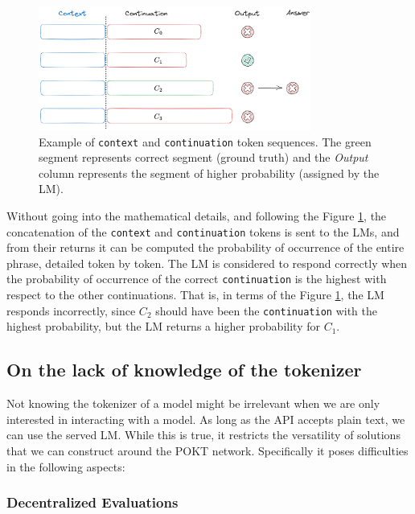 \begin{figure}[h]
    \centering
    \includegraphics[width=0.8\textwidth]{img/loglikelihood_example.png}
    \caption{Example of \texttt{context} and \texttt{continuation} token sequences. The green segment represents correct segment (ground truth) and the \emph{Output} column represents the segment of higher probability (assigned by the \gls{LM}).}
    \label{fig:loglikelihood_example}
\end{figure}

Without going into the mathematical details, and following the Figure \ref{fig:loglikelihood_example}, the concatenation of the \texttt{context} and \texttt{continuation} tokens is sent to the \glspl{LM}, and from their returns it can be computed the probability of occurrence of the entire phrase, detailed token by token. 
The \gls{LM} is considered to respond correctly when the probability of occurrence of the correct \texttt{continuation} is the highest with respect to the other continuations. That is, in terms of the Figure \ref{fig:loglikelihood_example}, the \gls{LM} responds incorrectly, since $C_2$ should have been the \texttt{continuation} with the highest probability, but the \gls{LM} returns a higher probability for $C_1$. 


\subsection{On the lack of knowledge of the tokenizer}\label{subsec:b2}

Not knowing the tokenizer of a model might be irrelevant when we are only interested in interacting with a model. As long as the \gls{API} accepts plain text, we can use the served \gls{LM}. While this is true, it restricts the versatility of solutions that we can construct around the POKT network. Specifically it poses difficulties in the following aspects:

\subsubsection*{Decentralized Evaluations}

